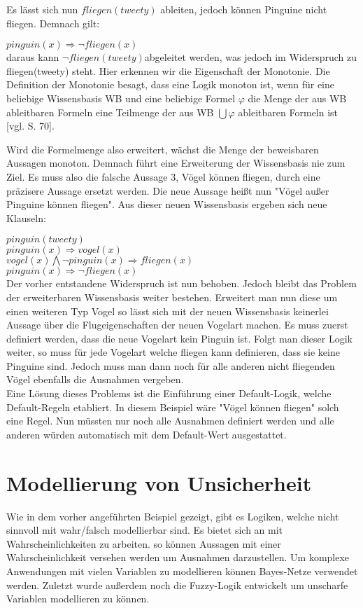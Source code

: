 Es lässt sich nun $fliegen(tweety)$ ableiten, jedoch können Pinguine nicht fliegen. Demnach gilt:


$pinguin(x)\Rightarrow \neg fliegen(x)$\\

daraus kann $ \neg fliegen(tweety) $abgeleitet werden, was jedoch im Widerspruch zu fliegen(tweety) steht. Hier erkennen wir die Eigenschaft der Monotonie. Die Definition der Monotonie besagt, dass eine Logik monoton ist, wenn für eine beliebige Wissensbasis WB und eine beliebige Formel $\varphi$ die Menge der aus WB ableitbaren Formeln eine Teilmenge 
der aus WB $\bigcup \varphi$ ableitbaren Formeln ist [vgl. S. 70].

Wird die Formelmenge also erweitert, wächst die Menge der beweisbaren Aussagen monoton. Demnach führt eine Erweiterung der Wissensbasis nie zum Ziel. Es muss also die falsche Aussage 3, Vögel können fliegen, durch eine präzisere Aussage ersetzt werden. Die neue Aussage heißt nun "Vögel außer Pinguine können fliegen". Aus dieser neuen Wissensbasis ergeben sich neue Klauseln:


$pinguin(tweety)$\\
$pinguin(x) \Rightarrow vogel(x)$\\
$vogel(x) \bigwedge \neg pinguin(x) \Rightarrow fliegen(x)$\\
$pinguin(x) \Rightarrow \neg fliegen(x)$\\

Der vorher entstandene Widerspruch ist nun behoben. Jedoch bleibt das Problem der erweiterbaren Wissensbasis weiter bestehen. Erweitert man nun diese um einen weiteren Typ Vogel so lässt sich mit der neuen Wissensbasis keinerlei Aussage über die Flugeigenschaften der neuen Vogelart machen. Es muss zuerst definiert werden, dass die neue Vogelart kein Pinguin ist. 
Folgt man dieser Logik weiter, so muss für jede Vogelart welche fliegen kann definieren, dass sie keine Pinguine sind. Jedoch muss man dann noch für alle anderen nicht fliegenden Vögel ebenfalls die Ausnahmen vergeben.\\
Eine Lösung dieses Problems ist die Einführung einer Default-Logik, welche Default-Regeln etabliert. In diesem Beispiel wäre "Vögel können fliegen" solch eine Regel. Nun müssten nur noch alle Ausnahmen definiert werden und alle anderen würden automatisch mit dem Default-Wert ausgestattet.

\section{Modellierung von Unsicherheit}
Wie in dem vorher angeführten Beispiel gezeigt, gibt es Logiken, welche nicht sinnvoll mit wahr/falsch modellierbar sind. Es bietet sich an mit Wahrscheinlichkeiten zu arbeiten. so können Aussagen mit einer Wahrscheinlichkeit versehen werden um Ausnahmen darzustellen.
Um komplexe Anwendungen mit vielen Variablen zu modellieren können Bayes-Netze verwendet werden.
Zuletzt wurde außerdem noch die Fuzzy-Logik entwickelt um unscharfe Variablen modellieren zu können.

